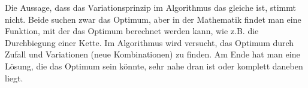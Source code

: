 Die Aussage, dass das Variationsprinzip im Algorithmus das gleiche ist, 
stimmt nicht. Beide suchen zwar das Optimum, aber in der Mathematik findet 
man eine Funktion, mit der das Optimum berechnet werden kann, wie z.B. 
die Durchbiegung einer Kette. Im Algorithmus wird versucht, das Optimum 
durch Zufall und Variationen (neue Kombinationen) zu finden. Am Ende 
hat man eine Lösung, die das Optimum sein könnte, sehr nahe dran ist 
oder komplett daneben liegt.
